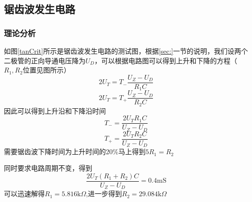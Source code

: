\documentclass[UTF8,a4paper]{paper}
\begin{document}
\subsection{锯齿波发生电路}
\subsubsection{理论分析}
如图\ref{tanCrit}所示是锯齿波发生电路的测试图，根据\ref{sec:}一节的说明，我们设两个二极管的正向导通电压降为$U_D$，可以根据电路图可以得到上升和下降的方程（$R_1,R_2$位置见图所示）
$$2U_T=T_-\frac{U_Z-U_D}{R_1C}$$
$$2U_T=T_+\frac{U_Z-U_D}{R_2C}$$
因此可以得到上升沿和下降沿时间
$$T_-=\frac{2U_TR_1C}{U_Z-U_D}$$
$$T_+=\frac{2U_TR_2C}{U_Z-U_D}$$
需要锯齿波下降时间为上升时间的20\%马上得到$5R_1=R_2$

同时要求电路周期不变，得到$$\frac{2U_T(R_1+R_2)C}{U_Z-U_D}=0.4\mathrm{mS}$$
可以迅速解得$R_1=5.816\mathrm{k}\Omega$,进一步得到$R_2=29.084\mathrm{k}\Omega$
\end{document}
